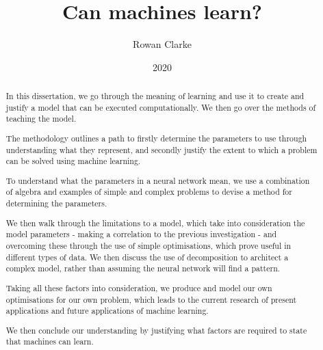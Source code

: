\documentclass[letterpaper]{article}
\begin{document}
\title{Can machines learn?}
\date{2020}
\author{Rowan Clarke}
\maketitle

\begin{abstract}

In this dissertation, we go through the meaning of learning and use it to create and justify a model that can be executed computationally. We then go over the methods of teaching the model.

The methodology outlines a path to firstly determine the parameters to use through understanding what they represent, and secondly justify the extent to which a problem can be solved using machine learning.

To understand what the parameters in a neural network mean, we use a combination of algebra and examples of simple and complex problems to devise a method for determining the parameters.

We then walk through the limitations to a model, which take into consideration the model parameters - making a correlation to the previous investigation - and overcoming these through the use of simple optimisations, which prove useful in different types of data. We then discuss the use of decomposition to architect a complex model, rather than assuming the neural network will find a pattern.

Taking all these factors into consideration, we produce and model our own optimisations for our own problem, which leads to the current research of present applications and future applications of machine learning.

We then conclude our understanding by justifying what factors are required to state that machines can learn.

\vspace{7mm}
\noindent

\end{abstract}

\newpage
\tableofcontents
\newpage



\newpage





\newpage



\newpage
\end{document}
